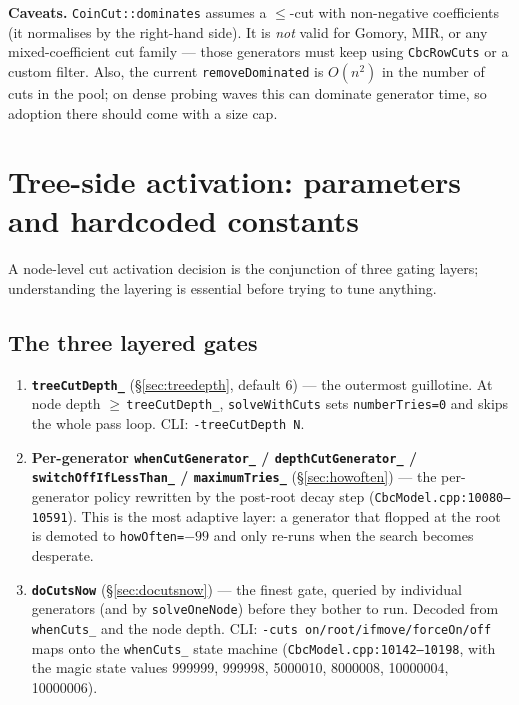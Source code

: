 \documentclass[11pt,a4paper]{article}
\begin{document}
\textbf{Caveats.}  \texttt{CoinCut::dominates} assumes a $\le$-cut
with non-negative coefficients (it normalises by the right-hand
side).  It is \emph{not} valid for Gomory, MIR, or any
mixed-coefficient cut family --- those generators must keep using
\texttt{CbcRowCuts} or a custom filter.  Also, the current
\texttt{removeDominated} is $O(n^2)$ in the number of cuts in the
pool; on dense probing waves this can dominate generator time, so
adoption there should come with a size cap.

\section{Tree-side activation: parameters and hardcoded constants}
\label{sec:treeparams}

A node-level cut activation decision is the conjunction of three
gating layers; understanding the layering is essential before
trying to tune anything.

\subsection*{The three layered gates}

\begin{enumerate}[leftmargin=*]
  \item \textbf{\texttt{treeCutDepth\_}} (\S\ref{sec:treedepth},
        default 6) --- the outermost guillotine.  At node depth
        $\ge\,$\texttt{treeCutDepth\_}, \texttt{solveWithCuts} sets
        \texttt{numberTries=0} and skips the whole pass loop.  CLI:
        \texttt{-treeCutDepth N}.
  \item \textbf{Per-generator
        \texttt{whenCutGenerator\_} / \texttt{depthCutGenerator\_}
        / \texttt{switchOffIfLessThan\_} / \texttt{maximumTries\_}}
        (\S\ref{sec:howoften}) --- the per-generator policy
        rewritten by the post-root decay step
        (\texttt{CbcModel.cpp:10080--10591}).  This is the most
        adaptive layer: a generator that flopped at the root is
        demoted to \texttt{howOften=$-99$} and only re-runs when the
        search becomes desperate.
  \item \textbf{\texttt{doCutsNow}} (\S\ref{sec:docutsnow}) --- the
        finest gate, queried by individual generators (and by
        \texttt{solveOneNode}) before they bother to run.  Decoded
        from \texttt{whenCuts\_} and the node depth.  CLI:
        \texttt{-cuts on/root/ifmove/forceOn/off} maps onto the
        \texttt{whenCuts\_} state machine
        (\texttt{CbcModel.cpp:10142--10198}, with the magic state
        values 999999, 999998, 5000010, 8000008, 10000004,
        10000006).
\end{enumerate}
\end{document}

